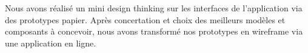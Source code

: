 \documentclass[t, 12pt, usenames,dvipsnames]{article}
\begin{document}
                \noindent Nous avons réalisé un mini design thinking sur les interfaces de l'application via des prototypes papier. Après concertation et choix des meilleurs modèles et composants à concevoir, nous avons transformé nos prototypes en wireframe via une application en ligne.
                
                \begin{center}
                    
                    \begin{figure}[h]       
                        \hfill                        {}

\end{figure}
\end{center}
\end{document}
